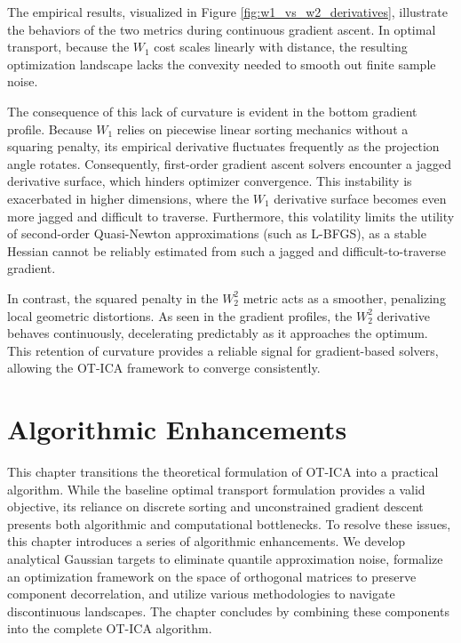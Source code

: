 \documentclass[12pt,a4paper,twoside,openany]{book}
\begin{document}
The empirical results, visualized in Figure \ref{fig:w1_vs_w2_derivatives}, illustrate the behaviors of 
the two metrics during continuous gradient ascent. In optimal transport, because the $W_1$ cost scales linearly with distance, 
the resulting optimization landscape lacks the convexity needed to smooth out finite sample noise.

The consequence of this lack of curvature is evident in the bottom gradient profile. Because $W_1$ relies on 
piecewise linear sorting mechanics without a squaring penalty, its empirical derivative fluctuates frequently 
as the projection angle rotates. Consequently, first-order gradient ascent solvers encounter a jagged derivative surface, 
which hinders optimizer convergence. This instability is exacerbated in higher dimensions, where the $W_1$ 
derivative surface becomes even more jagged and difficult to traverse. Furthermore, this volatility limits 
the utility of second-order Quasi-Newton approximations (such as L-BFGS), as a stable Hessian cannot be reliably estimated 
from such a jagged and difficult-to-traverse gradient.

In contrast, the squared penalty in the $W_2^2$ metric acts as a smoother, penalizing local geometric distortions. 
As seen in the gradient profiles, the $W_2^2$ derivative behaves continuously, decelerating predictably as it approaches the optimum. 
This retention of curvature provides a reliable signal for gradient-based solvers, allowing the OT-ICA framework to converge consistently.


\chapter{Algorithmic Enhancements}

This chapter transitions the theoretical formulation of OT-ICA into a practical algorithm. 
While the baseline optimal transport formulation provides a valid objective, its reliance on discrete sorting and unconstrained 
gradient descent presents both algorithmic and computational bottlenecks. To resolve these issues, this chapter introduces a series 
of algorithmic enhancements. We develop analytical Gaussian targets to eliminate quantile approximation noise, formalize 
an optimization framework on the space of orthogonal matrices to preserve component decorrelation, and utilize 
various methodologies to navigate discontinuous landscapes. The chapter concludes by 
combining these components into the complete OT-ICA algorithm.
\end{document}
